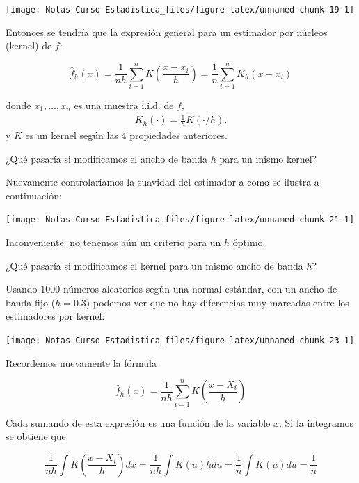 \documentclass[
  12pt,
]{book}
\begin{document}
\begin{center}\texttt{[image: Notas-Curso-Estadistica\_files/figure-latex/unnamed-chunk-19-1]} \end{center}

Entonces se tendría que la expresión general para un estimador por
núcleos (kernel) de \(f\):

\begin{equation*}
\hat{f}_{h}\left( x \right) = \frac{1}{nh}\sum_{i=1}^{n} K\left( \frac{x-x_{i}}{h} \right)=\frac{1}{n}\sum_{i=1}^{n} K_h(x-x_{i}) 
\end{equation*}

donde \(x_1,\ldots,x_n\) es una muestra i.i.d. de \(f\), \begin{align*}
K_h(\cdot)=\frac 1 h K(\cdot /h).
\end{align*} y \(K\) es un kernel según las 4 propiedades anteriores.

¿Qué pasaría si modificamos el ancho de banda \(h\) para un mismo
kernel?

Nuevamente controlaríamos la suavidad del estimador a como se ilustra a
continuación:

\begin{center}\texttt{[image: Notas-Curso-Estadistica\_files/figure-latex/unnamed-chunk-21-1]} \end{center}

Inconveniente: no tenemos aún un criterio para un \(h\) óptimo.

¿Qué pasaría si modificamos el kernel para un mismo ancho de banda
\(h\)?

Usando 1000 números aleatorios según una normal estándar, con un ancho
de banda fijo (\(h=0.3\)) podemos ver que no hay diferencias muy
marcadas entre los estimadores por kernel:

\begin{center}\texttt{[image: Notas-Curso-Estadistica\_files/figure-latex/unnamed-chunk-23-1]} \end{center}

Recordemos nuevamente la fórmula

\begin{equation*}
\hat{f}_{h}\left( x \right) = \frac{1}{nh}\sum_{i=1}^{n} K\left( \frac{x-X_{i}}{h} \right)
\end{equation*}

Cada sumando de esta expresión es una función de la variable \(x\). Si
la integramos se obtiene que

\begin{equation*}
\frac{1}{nh}\int K\left( \frac{x-X_{i}}{h} \right) dx
= \frac{1}{nh} \int K\left( u \right) h du
= \frac{1}{n} \int K(u) du
= \frac{1}{n}
\end{equation*}
\end{document}
